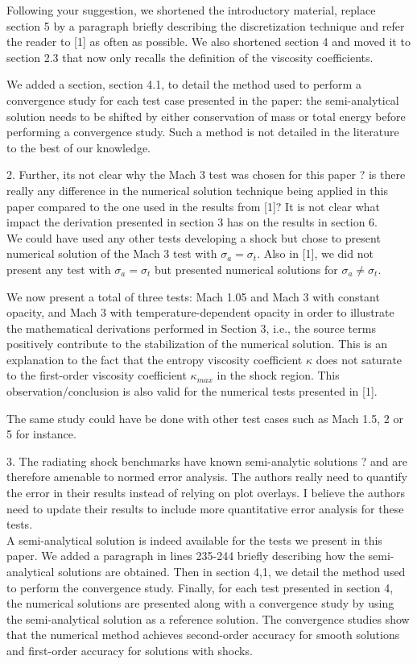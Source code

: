 \documentclass{article}
\begin{document}
Following your suggestion, we shortened the introductory material, replace section 5 by a paragraph briefly describing the discretization technique and refer the reader to [1] as often as possible. We also shortened section 4 and moved it to section 2.3 that now only recalls the definition of the viscosity coefficients. 

We added a section, section 4.1, to detail the method used to perform a convergence study for each test case presented in the paper: the semi-analytical solution needs to be shifted by either conservation of mass or total energy before performing a convergence study. Such a method is not detailed in the literature to the best of our knowledge.
\bigskip

{\color{blue}
2. Further, its not clear why the Mach 3 test was chosen for this paper ? is there really any difference in the numerical solution technique being applied in this paper compared to the one used in the results from [1]? It is not clear what impact the derivation presented in section 3 has on the results in section 6.\\}
We could have used any other tests developing a shock but chose to present numerical solution of the Mach 3 test with $\sigma_a = \sigma_t$. Also in [1], we did not present any test with $\sigma_a = \sigma_t$ but presented numerical solutions for $\sigma_a \neq \sigma_t$. 

We now present a total of three tests: Mach 1.05 and Mach 3 with constant opacity, and Mach 3 with temperature-dependent opacity in order to illustrate the mathematical derivations performed in Section 3, i.e., the source terms positively contribute to the stabilization of the numerical solution. This is an explanation to the fact that the entropy viscosity coefficient $\kappa$ does not saturate to the first-order viscosity coefficient $\kappa_{max}$ in the shock region. This observation/conclusion is also valid for the numerical tests presented in [1].

The same study could have be done with other test cases such as Mach 1.5, 2 or 5 for instance. 
\bigskip

{\color{blue}
3. 
The radiating shock benchmarks have known semi-analytic solutions ? and are therefore amenable to normed error analysis. The authors really need to quantify the error in their results instead of relying on plot overlays. I believe the authors need to update their results to include more quantitative error analysis for these tests.
\\}
A semi-analytical solution is indeed available for the tests we present in this paper. We added a paragraph in lines 235-244 briefly describing how the semi-analytical solutions are obtained. Then in section 4,1, we detail the method used to perform the convergence study. Finally, for each test presented in section 4, the numerical solutions are presented along with a convergence study by using the semi-analytical solution as a reference solution. 
The convergence studies show that the numerical method achieves second-order accuracy for smooth solutions and first-order accuracy for solutions with shocks. 
\bigskip
\end{document}
